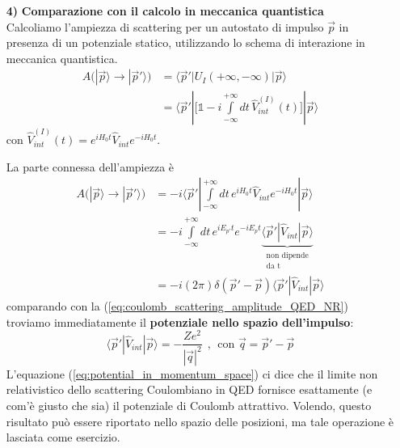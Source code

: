 \documentclass[../main.tex]{subfiles}
\begin{document}
\begin{enumerate}
    \item[\textbf{4)}] \textbf{Comparazione con il calcolo in meccanica quantistica}\\ 
    Calcoliamo l'ampiezza di scattering per un autostato di impulso $\Vec p$ in presenza di un potenziale statico, utilizzando lo schema di interazione in meccanica quantistica.
    \begin{align*}
        A\Big( |\Vec{p}\rangle \rightarrow |\Vec{p}'\rangle\Big) &= \langle \Vec{p}'|U_I(+\infty, -\infty)|\Vec{p}\rangle \\
        &=\langle \Vec{p}'| \Big[\mathbb 1 - i\int\limits_{-\infty}^{+\infty}dt\, \hat V^{(I)}_{int}(t)\Big]|\Vec{p}\rangle
    \end{align*}
    con \(\hat V^{(I)}_{int}(t) = e^{iH_0t}\hat V_{int}e^{-iH_0t}\).

    La parte connessa dell'ampiezza è 
    \begin{align*}
        A\Big( |\Vec{p}\rangle \rightarrow |\Vec{p}'\rangle\Big) &= - i\langle \Vec{p}'|\int\limits_{-\infty}^{+\infty}dt\, e^{iH_0t}\hat V_{int}e^{-iH_0t}|\Vec{p}\rangle \\
        & =  - i\int\limits_{-\infty}^{+\infty}dt\, e^{iE_{p'}t}e^{-iE_pt} 
            \underbrace{\langle \Vec{p}'| \hat V_{int} |\Vec{p}\rangle}_{\substack{\text{non dipende}\\\text{da t}}}\\
        & = -i(2\pi)\delta(\Vec{p}' - \Vec{p})\langle \Vec{p}'| \hat V_{int} |\Vec{p}\rangle
    \end{align*}
    comparando con la (\ref{eq:coulomb_scattering_amplitude_QED_NR}) troviamo immediatamente il \textbf{potenziale nello spazio dell'impulso}:
    \begin{equation}
        \boxed{\langle \Vec{p}'| \hat V_{int} |\Vec{p}\rangle = -\frac{Ze^2}{|\Vec{q}|^2}} ~~,~~ \text{con }\Vec{q} = \Vec{p}' - \Vec{p}
        \label{eq:potential_in_momentum_space}
    \end{equation}
    L'equazione (\ref{eq:potential_in_momentum_space}) ci dice che il limite non relativistico dello scattering Coulombiano in QED fornisce esattamente (e com'è giusto che sia) il potenziale di Coulomb attrattivo. Volendo, questo risultato può essere riportato nello spazio delle posizioni, ma tale operazione è lasciata come esercizio.
\end{enumerate}
\end{document}
